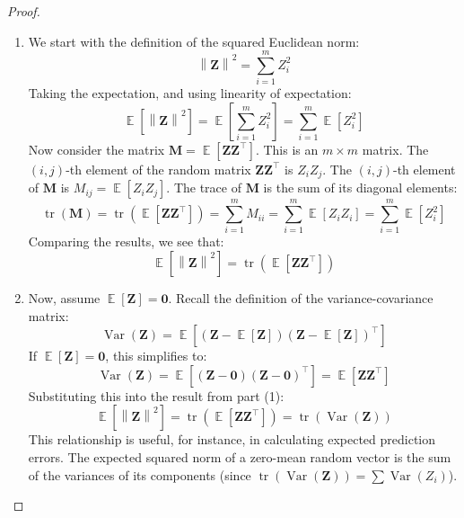 \documentclass[11pt, a4paper]{article}
\DeclareMathOperator{\E}{\mathbb{E}}             %
\DeclareMathOperator{\Var}{\mathrm{Var}}         %
\DeclareMathOperator{\tr}{\mathrm{tr}}           %
\theoremstyle{definition}
\theoremstyle{remark}
\newcommand{\mat}[1]{\mathbf{#1}}       %
\newcommand{\vect}[1]{\bm{#1}}          %
\newcommand{\transpose}{^{\top}}        %
\newcommand{\norm}[1]{\left\| #1 \right\|} %
\begin{document}
\begin{proof}
\begin{enumerate}
    \item We start with the definition of the squared Euclidean norm:
    \[ \norm{\vect{Z}}^2 = \sum_{i=1}^m Z_i^2 \]
    Taking the expectation, and using linearity of expectation:
    \[ \E[\norm{\vect{Z}}^2] = \E\left[ \sum_{i=1}^m Z_i^2 \right] = \sum_{i=1}^m \E[Z_i^2] \]
    Now consider the matrix $\mat{M} = \E[\vect{Z}\vect{Z}\transpose]$. This is an $m \times m$ matrix.
    The $(i, j)$-th element of the random matrix $\vect{Z}\vect{Z}\transpose$ is $Z_i Z_j$.
    The $(i, j)$-th element of $\mat{M}$ is $M_{ij} = \E[Z_i Z_j]$.
    The trace of $\mat{M}$ is the sum of its diagonal elements:
    \[ \tr(\mat{M}) = \tr(\E[\vect{Z}\vect{Z}\transpose]) = \sum_{i=1}^m M_{ii} = \sum_{i=1}^m \E[Z_i Z_i] = \sum_{i=1}^m \E[Z_i^2] \]
    Comparing the results, we see that:
    \[ \E[\norm{\vect{Z}}^2] = \tr(\E[\vect{Z}\vect{Z}\transpose]) \]

    \item Now, assume $\E[\vect{Z}] = \vect{0}$.
    Recall the definition of the variance-covariance matrix:
    \[ \Var(\vect{Z}) = \E[ (\vect{Z} - \E[\vect{Z}]) (\vect{Z} - \E[\vect{Z}])\transpose ] \]
    If $\E[\vect{Z}] = \vect{0}$, this simplifies to:
    \[ \Var(\vect{Z}) = \E[ (\vect{Z} - \vect{0}) (\vect{Z} - \vect{0})\transpose ] = \E[\vect{Z}\vect{Z}\transpose] \]
    Substituting this into the result from part (1):
    \[ \E[\norm{\vect{Z}}^2] = \tr(\E[\vect{Z}\vect{Z}\transpose]) = \tr(\Var(\vect{Z})) \]
    This relationship is useful, for instance, in calculating expected prediction errors. The expected squared norm of a zero-mean random vector is the sum of the variances of its components (since $\tr(\Var(\vect{Z})) = \sum \Var(Z_i)$).
\end{enumerate}
\end{proof}
\end{document}
